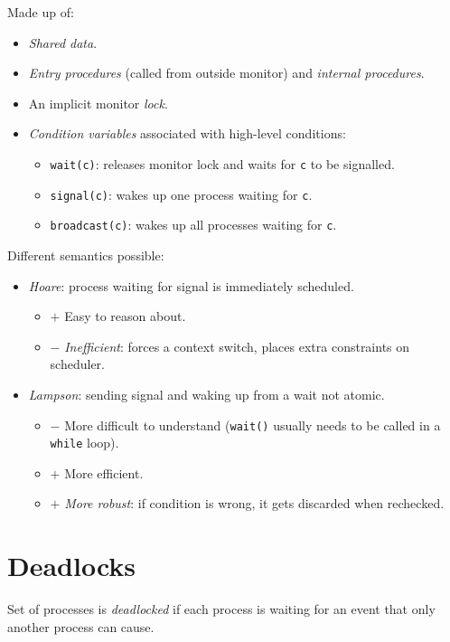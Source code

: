 \documentclass[twocolumn,english]{article}
\begin{document}
Made up of:
\begin{itemize}
\item \emph{Shared data}.
\item \emph{Entry procedures} (called from outside monitor) and \emph{internal
procedures}.
\item An implicit monitor \emph{lock}.
\item \emph{Condition variables} associated with high-level conditions:
\begin{itemize}
\item \texttt{wait(c)}: releases monitor lock and waits for \texttt{c} to
be signalled.
\item \texttt{signal(c)}: wakes up one process waiting for \texttt{c}.
\item \texttt{broadcast(c)}: wakes up all processes waiting for \texttt{c}.
\end{itemize}
\end{itemize}
Different semantics possible:
\begin{itemize}
\item \emph{Hoare}: process waiting for signal is immediately scheduled.
\begin{itemize}
\item $+$ Easy to reason about.
\item $-$ \emph{Inefficient}: forces a context switch, places extra constraints
on scheduler.
\end{itemize}
\item \emph{Lampson}: sending signal and waking up from a wait not atomic.
\begin{itemize}
\item $-$ More difficult to understand (\texttt{wait()} usually needs to
be called in a \texttt{while} loop).
\item $+$ More efficient.
\item $+$ \emph{More robust}: if condition is wrong, it gets discarded
when rechecked.
\end{itemize}
\end{itemize}

\section{Deadlocks}

Set of processes is \emph{deadlocked} if each process is waiting for
an event that only another process can cause.
\end{document}
